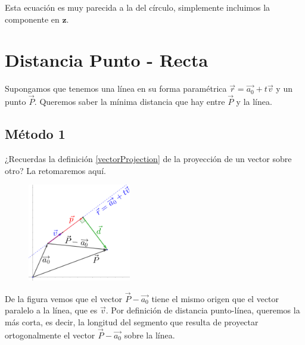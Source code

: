 \documentclass[12pt, fleqn]{report}                             %
\theoremstyle{break}                                            %
\newcommand{\lVec}[1]{\overrightarrow{#1}}                      %
\begin{document}
            Esta ecuación es muy parecida a la del círculo, simplemente incluimos
            la componente en $\mathbf{z}$.
            


        \clearpage    
        \section{Distancia Punto - Recta}
        
            Supongamos que tenemos una línea en su forma paramétrica $\vec{r} = \lVec{a_0} + t\vec{v}$
            y un punto $\vec{P}$. Queremos saber la mínima distancia que hay entre $\vec{P}$ y la línea.
        

            \subsection{Método 1}
                
                ¿Recuerdas la definición \ref{vectorProjection} de la proyección de un vector sobre otro?
                La retomaremos aquí.
                
                \begin{figure}[H]
                    \centering
                    \includegraphics[width=0.40\textwidth]{distancePointLine}
                \end{figure}
            
                De la figura vemos que el vector $\vec{P} - \lVec{a_0}$ tiene el mismo origen que el
                vector paralelo a la línea, que es $\vec{v}$. Por definición de distancia punto-línea,
                queremos la más corta, es decir, la longitud del segmento que resulta de proyectar
                ortogonalmente el vector $\vec{P} - \lVec{a_0}$ sobre la línea.
                
\end{document}
